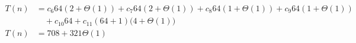 \begin{subequations}
\label{eq:findlinesegments1}
\begin{align}
\label{eq:findlinesegments1-1}
T(n)& =
c_{6}64(2 + \Theta(1))
+ c_{7}64(2 + \Theta(1))
+ c_{8}64(1 + \Theta(1))
+ c_{9}64(1 + \Theta(1))
\\
& \quad
+ c_{10}64
+ c_{11}(64 + 1)\bigl(4 + \Theta(1)\bigr)
\nonumber \\
\label{eq:findlinesegments1-2}
T(n)& =
708 + 321\Theta(1)
\end{align}
\end{subequations}
